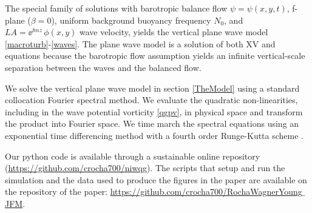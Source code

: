 \documentclass{jfm}
\begin{document}
The special family of solutions with barotropic balance flow $\psi =\psi(x,y,t)$,
f-plane ($\beta = 0$), uniform background
buoyancy frequency $N_0$, and $LA = \ee^{\ii m z}\,\phi(x,y)$ wave velocity,
yields the vertical plane wave model \eqref{macroturb}-\eqref{waves}. The plane
wave model is a solution of both XV and \cite{wagner_young2016} equations because the
barotropic flow assumption yields an infinite vertical-scale separation between
the waves and the balanced flow.

We solve the vertical plane wave model in section \ref{TheModel} using a standard
collocation Fourier spectral method.
We evaluate the quadratic non-linearities, including in the wave potential
vorticity \eqref{qgpv}, in
physical space and transform the product into Fourier space. We time march the
spectral equations
using an exponential time differencing method with a fourth order Runge-Kutta scheme
\citep[details in][]{kassam_trefethen2005}.

Our python code is available through a sustainable online repository
(\href{https://github.com/crocha700/niwqg}{https://github.com/crocha700/niwqg}).
The scripts that setup and run the simulation and the data used to produce the
figures in the paper are available on the
repository of the paper:
\href{https://github.com/crocha700/RochaWagnerYoung_JFM}{https://github.com/crocha700/RochaWagnerYoung$\_$JFM}.
\end{document}
